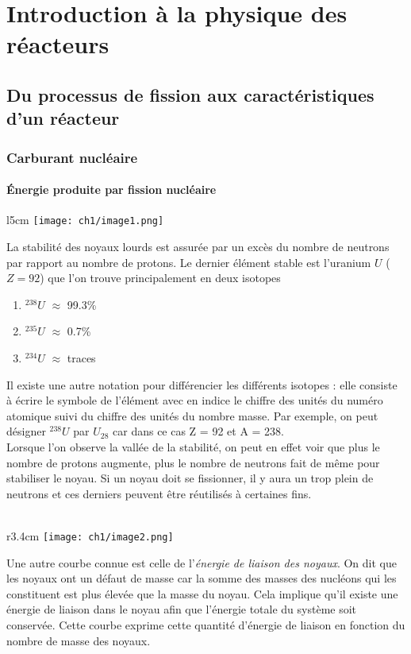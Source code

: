 \chapter{Introduction à la physique des réacteurs}
\section{Du processus de fission aux caractéristiques d'un réacteur}
\subsection{Carburant nucléaire}
\subsubsection{Énergie produite par fission nucléaire}

	\begin{wrapfigure}[12]{l}{5cm}
	\vspace{-5mm}
	\texttt{[image: ch1/image1.png]}
	\end{wrapfigure}
La stabilité des noyaux lourds est assurée par un excès du nombre de neutrons par rapport au 
nombre de protons. Le dernier élément stable est l'uranium $U$ ($Z=92$) que l'on trouve 
principalement en deux isotopes
\begin{enumerate}
\item $ ^{238}U$ $\approx$ 99.3\%
\item $ ^{235}U$ $\approx$ 0.7\%
\item $ ^{234}U$ $\approx$ traces
\end{enumerate}

Il existe une autre notation pour différencier les différents isotopes : elle consiste à écrire le symbole
de l'élément avec en indice le chiffre des unités du numéro atomique suivi du chiffre des unités du nombre
masse. Par exemple, on peut désigner $ ^{238}U$ par $U_{28}$ car dans ce cas Z = 92 et A = 238.\\

Lorsque l'on observe la vallée de la stabilité, on peut en effet voir que plus le nombre de 
protons augmente, plus le nombre de neutrons fait de même pour stabiliser le noyau. Si un 
noyau doit se fissionner, il y aura un trop plein de neutrons et ces derniers peuvent 
être réutilisés à certaines fins.\\ 
\\


	\begin{wrapfigure}[8]{r}{3.4cm}
	\vspace{-8mm}
	\texttt{[image: ch1/image2.png]}
	\end{wrapfigure}
Une autre courbe connue est celle de l'\textit{énergie de liaison des noyaux}. 
On dit que les noyaux ont un défaut de masse car la somme des masses des nucléons
qui les constituent est plus élevée que la masse du noyau.
Cela implique qu'il existe une énergie de liaison dans le noyau afin que l'énergie
totale du système soit conservée. Cette courbe exprime cette quantité d'énergie
de liaison en fonction du nombre de masse des noyaux.\\

